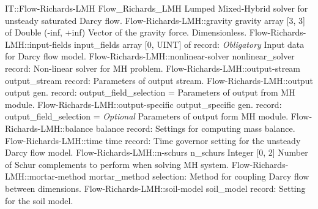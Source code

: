 \begin{RecordType}
	{IT::Flow-Richards-LMH}
	{Flow{\_}Richards{\_}LMH}
	{}%
	{}%
	{{{Lumped Mixed-Hybrid solver for unsteady saturated Darcy flow.}%
}}
		\RecKey
			{Flow-Richards-LMH::gravity}
			{gravity}
			{{array [3, 3] of }{Double (-inf, +inf)}}{}
			{ \ValueDefault{[0, 0, -1]}}
			{{{Vector of the gravity force.
Dimensionless.}%
}}
		\RecKey
			{Flow-Richards-LMH::input-fields}
			{input{\_}fields}
			{{array [0, UINT] of }{record: }}{}
			{ \it{Obligatory}}
			{{{Input data for Darcy flow model.}%
}}
		\RecKey
			{Flow-Richards-LMH::nonlinear-solver}
			{nonlinear{\_}solver}
			{{record: }}{}
			{ \ValueDefault{{\{}{\}}}}
			{{{Non-linear solver for MH problem.}%
}}
		\RecKey
			{Flow-Richards-LMH::output-stream}
			{output{\_}stream}
			{{record: }}{}
			{ \ValueDefault{{\{}{\}}}}
			{{{Parameters of output stream.}%
}}
		\RecKey
			{Flow-Richards-LMH::output}
			{output}
			{{gen. record: }}{{output{\_}field{\_}selection}{ = }}
			{ }
			{{{Parameters of output from MH module.}%
}}
		\RecKey
			{Flow-Richards-LMH::output-specific}
			{output{\_}specific}
			{{gen. record: }}{{output{\_}field{\_}selection}{ = }}
			{ \it{Optional}}
			{{{Parameters of output form MH module.}%
}}
		\RecKey
			{Flow-Richards-LMH::balance}
			{balance}
			{{record: }}{}
			{ \ValueDefault{{\{}{\}}}}
			{{{Settings for computing mass balance.}%
}}
		\RecKey
			{Flow-Richards-LMH::time}
			{time}
			{{record: }}{}
			{ \ValueDefault{{\{}{\}}}}
			{{{Time governor setting for the unsteady Darcy flow model.}%
}}
		\RecKey
			{Flow-Richards-LMH::n-schurs}
			{n{\_}schurs}
			{{Integer [0, 2]}}{}
			{ }
			{{{Number of Schur complements to perform when solving MH system.}%
}}
		\RecKey
			{Flow-Richards-LMH::mortar-method}
			{mortar{\_}method}
			{{selection: }}{}
			{ }
			{{{Method for coupling Darcy flow between dimensions.}%
}}
		\RecKey
			{Flow-Richards-LMH::soil-model}
			{soil{\_}model}
			{{record: }}{}
			{ }
			{{{Setting for the soil model.}%
}}
\end{RecordType}
